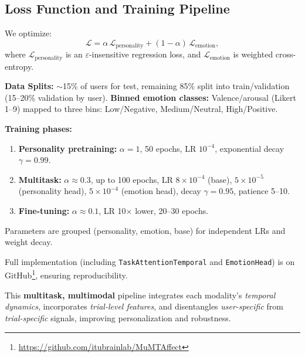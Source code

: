 \documentclass[sigconf]{acmart}
\begin{document}
\subsection{Loss Function and Training Pipeline}

We optimize:
\[
\mathcal{L} = \alpha \, \mathcal{L}_{\text{personality}} + (1 - \alpha) \, \mathcal{L}_{\text{emotion}},
\]
where $\mathcal{L}_{\text{personality}}$ is an $\varepsilon$-insensitive regression loss, and $\mathcal{L}_{\text{emotion}}$ is weighted cross-entropy.

\noindent\textbf{Data Splits:} $\sim$15\% of users for test, remaining 85\% split into train/validation (15–20\% validation by user).  
\noindent\textbf{Binned emotion classes:} Valence/arousal (Likert 1–9) mapped to three bins: Low/Negative, Medium/Neutral, High/Positive.

\noindent\textbf{Training phases:}
\begin{enumerate}
    \item \textbf{Personality pretraining:} $\alpha=1$, 50 epochs, LR $10^{-4}$, exponential decay $\gamma=0.99$.
    \item \textbf{Multitask:} $\alpha\approx0.3$, up to 100 epochs, LR $8{\times}10^{-4}$ (base), $5{\times}10^{-5}$ (personality head), $5{\times}10^{-4}$ (emotion head), decay $\gamma=0.95$, patience 5–10.
    \item \textbf{Fine-tuning:} $\alpha\approx0.1$, LR 10$\times$ lower, 20–30 epochs.
\end{enumerate}
Parameters are grouped (personality, emotion, base) for independent LRs and weight decay.

\noindent Full implementation (including \texttt{TaskAttentionTemporal} and \texttt{EmotionHead}) is on GitHub\footnote{\url{https://github.com/itubrainlab/MuMTAffect}}, ensuring reproducibility.

\noindent This \textbf{multitask, multimodal} pipeline integrates each modality’s \emph{temporal dynamics}, incorporates \emph{trial-level features}, and disentangles \emph{user-specific} from \emph{trial-specific} signals, improving personalization and robustness.












\end{document}

